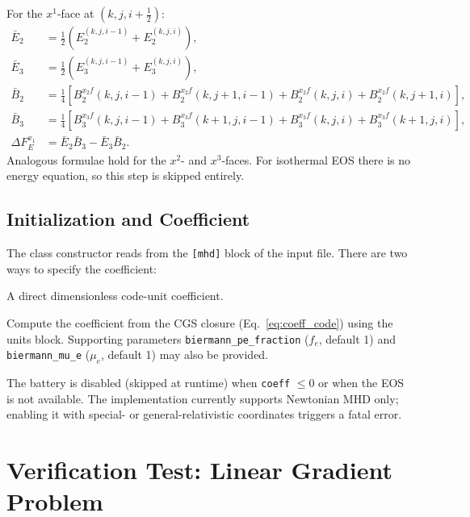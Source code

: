 \documentclass[11pt]{article}
\newcommand{\half}{\tfrac{1}{2}}
\begin{document}
For the $x^1$-face at $(k,j,i+\half)$:
\begin{align}
  \bar{E}_2 &= \half\!\left(E_2^{(k,j,i-1)} + E_2^{(k,j,i)}\right), \\
  \bar{E}_3 &= \half\!\left(E_3^{(k,j,i-1)} + E_3^{(k,j,i)}\right), \\
  \bar{B}_2 &= \tfrac{1}{4}\!\left[
    B_2^{x_2f}(k,j,i-1) + B_2^{x_2f}(k,j+1,i-1)
  + B_2^{x_2f}(k,j,i)   + B_2^{x_2f}(k,j+1,i)\right], \\
  \bar{B}_3 &= \tfrac{1}{4}\!\left[
    B_3^{x_3f}(k,j,i-1)   + B_3^{x_3f}(k+1,j,i-1)
  + B_3^{x_3f}(k,j,i)     + B_3^{x_3f}(k+1,j,i)\right], \\
  \Delta F_E^{x_1} &= \bar{E}_2\bar{B}_3 - \bar{E}_3\bar{B}_2.
  \label{eq:fe_x1}
\end{align}
Analogous formulae hold for the $x^2$- and $x^3$-faces.  For isothermal EOS
there is no energy equation, so this step is skipped entirely.

\subsection{Initialization and Coefficient}

The class constructor reads from the \texttt{[mhd]} block of the input file.
There are two ways to specify the coefficient:

\begin{description}[leftmargin=2em]
  \item[\texttt{biermann\_coeff}]
        A direct dimensionless code-unit coefficient.
  \item[\texttt{biermann\_from\_cgs = true}]
        Compute the coefficient from the CGS closure
        (Eq.~\ref{eq:coeff_code}) using the units block.
        Supporting parameters \texttt{biermann\_pe\_fraction} ($f_e$,
        default 1) and \texttt{biermann\_mu\_e} ($\mu_e$, default 1) may also
        be provided.
\end{description}

The battery is disabled (skipped at runtime) when \texttt{coeff} $\leq 0$ or
when the EOS is not available.  The implementation currently supports
Newtonian MHD only; enabling it with special- or general-relativistic
coordinates triggers a fatal error.

\section{Verification Test: Linear Gradient Problem}
\label{sec:test}
\end{document}
